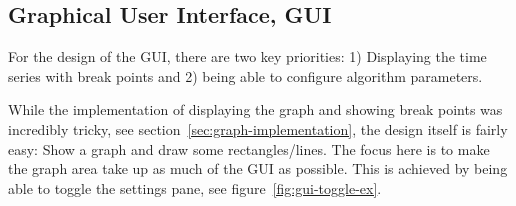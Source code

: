 \subsection{Graphical User Interface, GUI}

For the design of the GUI, there are two key priorities: 1) Displaying the time
series with break points and 2) being able to configure algorithm parameters. 

While the implementation of displaying the graph and showing break points was incredibly tricky, see
section~\ref{sec:graph-implementation}, the design itself is fairly easy: Show a
graph and draw some rectangles/lines. The focus here is to make the graph area
take up as much of the GUI as possible. This is achieved by being able to toggle
the settings pane, see figure~\ref{fig:gui-toggle-ex}. 

